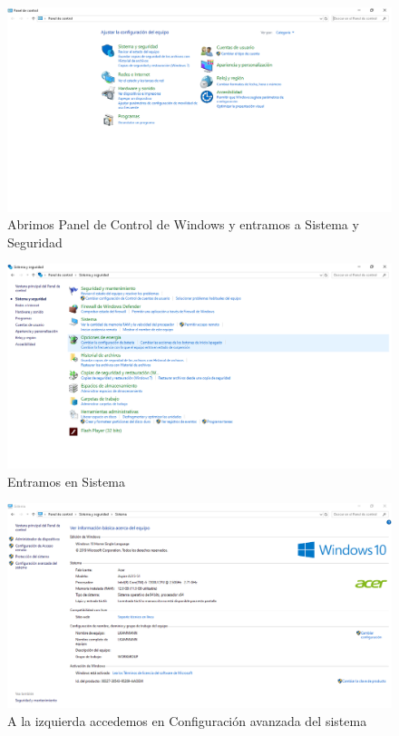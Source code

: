 \begin{figure}[H]
    \centering
    \includegraphics[scale=0.3]{imagenes/cmd/cmd_0.PNG}
    \caption{Abrimos Panel de Control de Windows y entramos a Sistema y Seguridad}
\end{figure}

\begin{figure}[H]
    \centering
    \includegraphics[scale=0.3]{imagenes/cmd/cmd_1.PNG}
    \caption{Entramos en Sistema}
\end{figure}

\begin{figure}[H]
    \centering
    \includegraphics[scale=0.3]{imagenes/cmd/cmd_2.PNG}
    \caption{A la izquierda accedemos en Configuraci\'on avanzada del sistema}
\end{figure}


